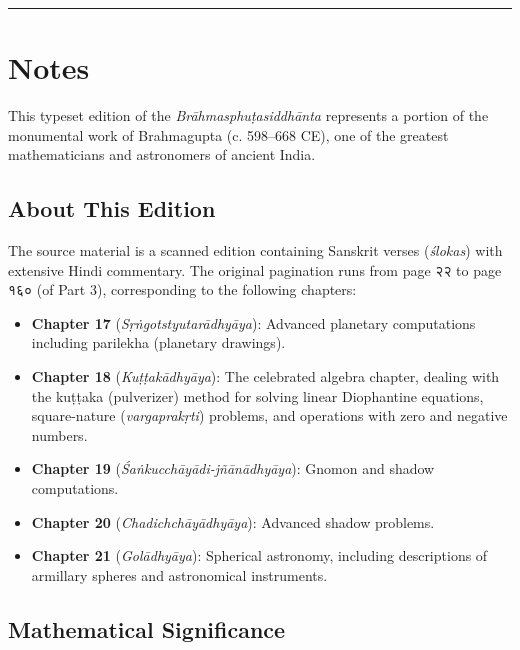 \documentclass[11pt,a4paper]{article}
\newcommand{\longline}{\noindent\rule{\textwidth}{0.4pt}}
\begin{document}
\vspace{2em}
\longline

\newpage
\section*{Notes}

This typeset edition of the \textit{Brāhmasphuṭasiddhānta} represents a portion of the monumental work of Brahmagupta (c. 598–668 CE), one of the greatest mathematicians and astronomers of ancient India.

\subsection*{About This Edition}

The source material is a scanned edition containing Sanskrit verses (\textit{ślokas}) with extensive Hindi commentary. The original pagination runs from page २२ to page १६० (of Part 3), corresponding to the following chapters:

\begin{itemize}
  \item \textbf{Chapter 17} (\textit{Sṛṅgotstyutarādhyāya}): Advanced planetary computations including parilekha (planetary drawings).
  \item \textbf{Chapter 18} (\textit{Kuṭṭakādhyāya}): The celebrated algebra chapter, dealing with the kuṭṭaka (pulverizer) method for solving linear Diophantine equations, square-nature (\textit{vargaprakṛti}) problems, and operations with zero and negative numbers.
  \item \textbf{Chapter 19} (\textit{Śaṅkucchāyādi-jñānādhyāya}): Gnomon and shadow computations.
  \item \textbf{Chapter 20} (\textit{Chadichchāyādhyāya}): Advanced shadow problems.
  \item \textbf{Chapter 21} (\textit{Golādhyāya}): Spherical astronomy, including descriptions of armillary spheres and astronomical instruments.
\end{itemize}

\subsection*{Mathematical Significance}
\end{document}
